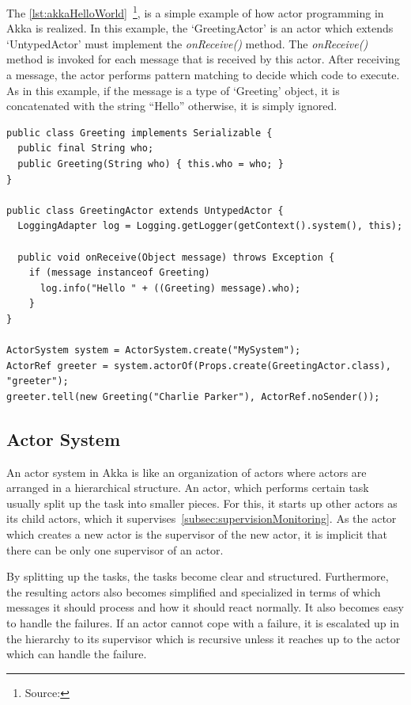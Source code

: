   The \autoref{lst:akkaHelloWorld}~\footnote{Source: }, is a simple example of how actor programming in Akka is realized. In this example, the ‘GreetingActor’ is an actor which extends ‘UntypedActor’ must implement the \emph{onReceive()} method. The \emph{onReceive()} method is invoked for each message that is received by this actor. After receiving a message, the actor performs pattern matching to decide which code to execute. As in this example, if the message is a type of ‘Greeting’ object, it is concatenated with the string “Hello” otherwise, it is simply ignored.

\begin{lstlisting}[caption=A simple example of actor programming in akka~\cite{akkaHome}, label=lst:akkaHelloWorld]
public class Greeting implements Serializable {
  public final String who;
  public Greeting(String who) { this.who = who; }
}

public class GreetingActor extends UntypedActor {
  LoggingAdapter log = Logging.getLogger(getContext().system(), this);

  public void onReceive(Object message) throws Exception {
    if (message instanceof Greeting)
      log.info("Hello " + ((Greeting) message).who);
    }
}

ActorSystem system = ActorSystem.create("MySystem");
ActorRef greeter = system.actorOf(Props.create(GreetingActor.class), "greeter");
greeter.tell(new Greeting("Charlie Parker"), ActorRef.noSender());
\end{lstlisting}


  \subsection{Actor System}
      An actor system in Akka is like an organization of actors where actors are arranged in a hierarchical structure. An actor, which performs certain task usually split up the task into smaller pieces. For this, it starts up other actors as its child actors, which it supervises~\autoref{subsec:supervisionMonitoring}. As the actor which creates a new actor is the supervisor of the new actor, it is implicit that there can be only one supervisor of an actor.

  By splitting up the tasks, the tasks become clear and structured. Furthermore, the resulting actors also becomes simplified and specialized in terms of which messages it should process and how it should react normally. It also becomes easy to handle the failures. If an actor cannot cope with a failure, it is escalated up in the hierarchy to its supervisor which is recursive unless it reaches up to the actor which can handle the failure.~\cite{akkaJavaDoc}

